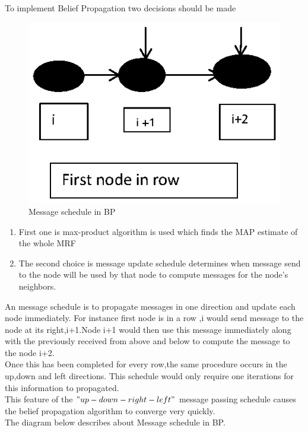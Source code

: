 To  implement Belief Propagation two decisions should be made
\pagebreak
\begin{figure}[h]
\begin{center}
\includegraphics[width=7in]{msgsc.eps}
\caption{Message schedule in BP } \label{msgsc}
\end{center}
\end{figure}



\begin{enumerate}
  \item First one is max-product algorithm is used  which finds the MAP estimate of the whole MRF
  \item The second choice is message update schedule determines when message send to the node will be used by that node to compute messages for the node's neighbors.
\end{enumerate}
 An message schedule is to propagate messages in one direction and update each node immediately.
For instance first node is in a row ,i would send message to the node at its right,i+1.Node i+1 would then use this message immediately along with the previously received from above and below to compute the message to the node i+2.
\\ Once this has been completed for every row,the same procedure occurs in the up,down and left directions. This schedule would only require one iterations for this information to propagated.
\\This feature of the $"up-down-right-left"$ message passing schedule causes the belief propagation algorithm to converge very quickly.
\\The diagram  below describes about Message schedule in BP.\\



